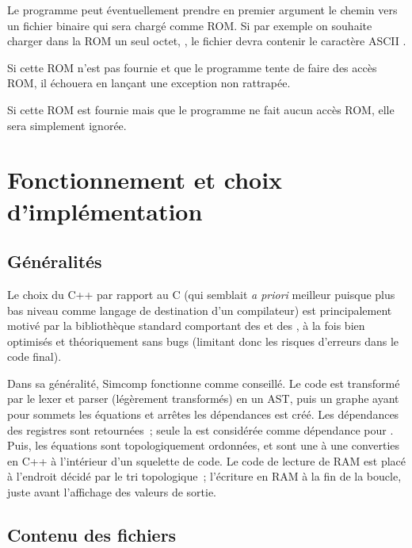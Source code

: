 \documentclass[11pt,a4paper]{article}
\begin{document}
Le programme peut éventuellement prendre en premier argument le chemin vers un fichier binaire qui sera chargé comme ROM. Si par exemple on souhaite charger dans la ROM un seul octet, , le fichier devra contenir le caractère ASCII \og * \fg{}.

Si cette ROM n'est pas fournie et que le programme tente de faire des accès ROM, il échouera en lançant une exception non rattrapée.

Si cette ROM est fournie mais que le programme ne fait aucun accès ROM, elle sera simplement ignorée.

\section{Fonctionnement et choix d'implémentation}

\subsection{Généralités}

Le choix du C++ par rapport au C (qui semblait \textit{a priori} meilleur puisque plus bas niveau comme langage de destination d'un compilateur) est principalement motivé par la bibliothèque standard comportant des  et des , à la fois bien optimisés et théoriquement sans bugs (limitant donc les risques d'erreurs dans le code final).

Dans sa généralité, Simcomp fonctionne comme conseillé. Le code est transformé par le lexer et parser (légèrement transformés) en un AST, puis un graphe ayant pour sommets les équations et arrêtes les dépendances est créé. Les dépendances des registres sont retournées~; seule la  est considérée comme dépendance pour . Puis, les équations sont topologiquement ordonnées, et sont une à une converties en C++ à l'intérieur d'un squelette de code. Le code de lecture de RAM est placé à l'endroit décidé par le tri topologique~; l'écriture en RAM à la fin de la boucle, juste avant l'affichage des valeurs de sortie.

\subsection{Contenu des fichiers}
\end{document}
